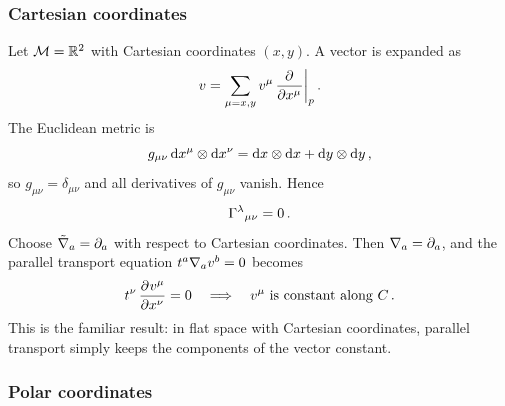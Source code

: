\subsubsection{Cartesian coordinates}\label{sec:R2-cartesian}

\begin{example}%
\label{ex:R2-cartesian}
  Let $\mathcal{M} = \mathbb{R}^{2}$ with Cartesian coordinates $(x,y)$.  A
  vector is expanded as
  \[
    v = \sum_{\mu = x,y} v^\mu\,
      \frac{\partial^{} }{\partial {x^\mu}^{}}\bigg|_p\,.
  \]
  The Euclidean metric is
  \[
    g_{\mu\nu}\,\mathrm{d} x^\mu \otimes \mathrm{d} x^\nu
      = \mathrm{d} x \otimes \mathrm{d} x + \mathrm{d} y \otimes \mathrm{d} y\,,
  \]
  so $g_{\mu\nu} = \delta_{\mu\nu}$ and all derivatives of
  $g_{\mu\nu}$ vanish.  Hence
  \[
    \Gamma^{\lambda}{}_{\mu\nu} = 0\,.
  \]
  Choose $\tilde{\nabla}_a = \partial_a$ with respect to Cartesian
  coordinates.  Then $\nabla_a = \partial_a$, and the parallel
  transport equation $t^a \nabla_a v^b = 0$ becomes
  \[
    t^\nu\,\frac{\partial^{} v^\mu}{\partial {x^\nu}^{}} = 0
    \quad\Longrightarrow\quad
    v^\mu \text{ is constant along } C\,.
  \]
  This is the familiar result: in flat space with Cartesian
  coordinates, parallel transport simply keeps the components
  of the vector constant.
\end{example}

\subsubsection{Polar coordinates}\label{sec:R2-polar}

